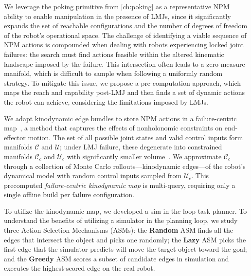 We leverage the poking primitive from \cref{ch:poking} as a representative NPM ability to enable manipulation in the presence of LMJs, since it significantly expands the set of reachable configurations and the number of degrees of freedom of the robot's operational space.
The challenge of identifying a viable sequence of NPM actions is compounded when dealing with robots experiencing locked joint failures: the search must find actions feasible within the altered kinematic landscape imposed by the failure.
This intersection often leads to a zero-measure manifold, which is difficult to sample when following a uniformly random strategy.
To mitigate this issue, we propose a pre-computation approach, which maps the reach and capability post-LMJ and then finds a set of dynamic actions the robot can achieve, considering the limitations imposed by LMJs.

We adapt kinodynamic edge bundles to store NPM actions in a failure-centric map~\cite{shome2021asymptotically}, a method that captures the effects of nonholonomic constraints on end-effector motion.
The set of all possible joint states and valid control inputs form manifolds $\mathcal{C}$ and $\mathcal{U}$; under LMJ failure, these degenerate into constrained manifolds $\mathcal{C}_c$ and $\mathcal{U}_c$ with significantly smaller volume~\cite{kingston2018sampling}.
We approximate $\mathcal{C}_c$ through a collection of Monte Carlo rollouts---kinodynamic edges---of the robot's dynamical model with random control inputs sampled from $\mathcal{U}_c$.
This precomputed \textit{failure-centric kinodynamic map} is multi-query, requiring only a single offline build per failure configuration.

To utilize the kinodynamic map, we developed a sim-in-the-loop task planner.
To understand the benefits of utilizing a simulator in the planning loop, we study three Action Selection Mechanisms (ASMs):
the \textbf{Random} ASM finds all the edges that intersect the object and picks one randomly;
the \textbf{Lazy} ASM picks the first edge that the simulator predicts will move the target object toward the goal;
and the \textbf{Greedy} ASM scores a subset of candidate edges in simulation and executes the highest-scored edge on the real robot.

